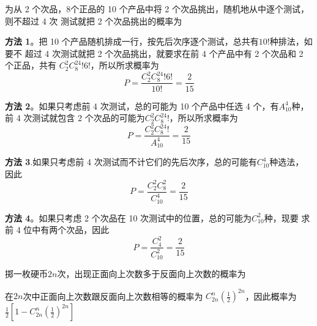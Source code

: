 \documentclass{article}
\begin{document}
\begin{examplle}[]
为从 2 个次品，8个正品的 10 个产品中将 2 个次品挑出，随机地从中逐个测试，则不超过 4 次
测试就把 2 个次品挑出的概率为

\textbf{方法 1}。把 10 个产品随机排成一行，按先后次序逐个测试，总共有\(10!\)种排法，如要不
 超过 4 次测试就把 2 个次品挑出，就要求在前 4 个产品中有 2 个次品和 2 个正品，共有
 \(C_2^2C_8^24!6!\)，所以所求概率为
\begin{equation*}
P=\frac{C_2^2C_8^24!6!}{10!}=\frac{2}{15}
\end{equation*}

\textbf{方法 2}。如果只考虑前 4 次测试，总的可能为 10 个产品中任选 4 个，有\(A_{10}^4\)种，前
 4 次测试就包含 2 个次品的可能为\(C_2^2C_8^24!\)，所以所求概率为
\begin{equation*}
P=\frac{C_2^2C_8^24!}{A_{10}^4}=\frac{2}{15}
\end{equation*}

\textbf{方法 3}.如果只考虑前 4 次测试而不计它们的先后次序，总的可能有\(C_{10}^4\)种选法，
 因此
\begin{equation*}
P=\frac{C_2^2C_8^2}{C_{10}^4}=\frac{2}{15}
\end{equation*}

\textbf{方法 4}。如果只考虑 2 个次品在 10 次测试中的位置，总的可能为\(C_{10}^2\)种，现要
 求前 4 位中有两个次品，因此
\begin{equation*}
P=\frac{C_4^2}{C_{10}^2}=\frac{2}{15}
\end{equation*}
\end{examplle}

\begin{examplle}[]
掷一枚硬币\(2n\)次，出现正面向上次数多于反面向上次数的概率为

在\(2n\)次中正面向上次数跟反面向上次数相等的概率为
\(C_{2n}^n(\frac{1}{2})^{2n}\)，因此概率为\(\frac{1}{2}[1-C_{2n}^n(\frac{1}{2})^{2n}]\)
\end{examplle}
\end{document}
